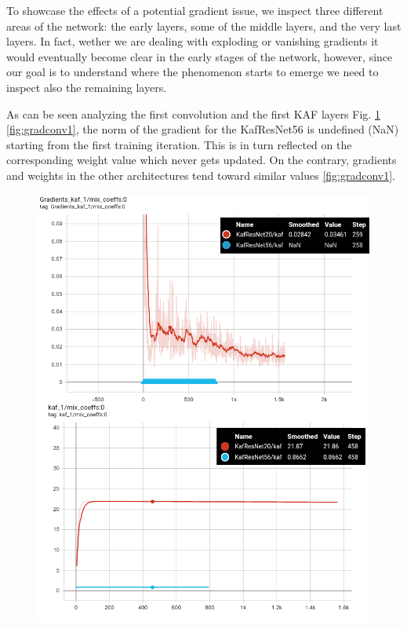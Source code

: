 \documentclass[LaM,binding=0.6cm]{./packages/sapthesis/sapthesis}
\begin{document}
        To showcase the effects of a potential gradient issue, we inspect three different areas of the network: the early layers, some of the middle layers, and the very last layers. In fact, 
        wether we are dealing with exploding or vanishing gradients it would eventually become clear in the early stages of the network, however, since our goal is to understand where the phenomenon starts to emerge
        we need to inspect also the remaining layers. 
        
        As can be seen analyzing the first convolution and the first KAF layers Fig. \ref{fig:gradkaf1} \ref{fig:gradconv1}, the norm of the gradient for the KafResNet56 is undefined (NaN) starting from the first training iteration.
        This is in turn reflected on the corresponding weight value which never gets updated. On the contrary, gradients and weights in the other architectures tend toward similar values \ref{fig:gradconv1}. 
        \begin{figure}[h!]
            \centering
            \includegraphics[scale=0.32]{kaf1.png}
            \caption{}
            \label{fig:gradkaf1}
        \end{figure}      
        
\end{document}
